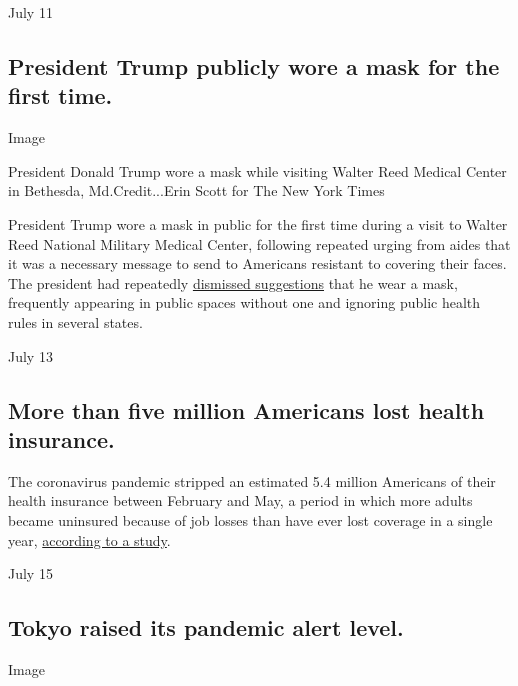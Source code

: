 July 11

\hypertarget{president-trump-publicly-wore-a-mask-for-the-first-time}{%
\subsection{President Trump publicly wore a mask for the first
time.}\label{president-trump-publicly-wore-a-mask-for-the-first-time}}

Image

President Donald Trump wore a mask while visiting Walter Reed Medical
Center in Bethesda, Md.Credit...Erin Scott for The New York Times

President Trump wore a mask in public for the first time during a visit
to Walter Reed National Military Medical Center, following repeated
urging from aides that it was a necessary message to send to Americans
resistant to covering their faces. The president had repeatedly
\href{https://www.nytimes3xbfgragh.onion/video/us/politics/100000007070943/trump-mask-coronavirus.html}{dismissed
suggestions} that he wear a mask, frequently appearing in public spaces
without one and ignoring public health rules in several states.

July 13

\hypertarget{more-than-five-million-americans-lost-health-insurance}{%
\subsection{More than five million Americans lost health
insurance.}\label{more-than-five-million-americans-lost-health-insurance}}

The coronavirus pandemic stripped an estimated 5.4 million Americans of
their health insurance between February and May, a period in which more
adults became uninsured because of job losses than have ever lost
coverage in a single year,
\href{https://www.nytimes3xbfgragh.onion/2020/07/13/us/politics/coronavirus-health-insurance-trump.html?action=click\&module=RelatedLinks\&pgtype=Article}{according
to a study}.

July 15

\hypertarget{tokyo-raised-its-pandemic-alert-level}{%
\subsection{Tokyo raised its pandemic alert
level.}\label{tokyo-raised-its-pandemic-alert-level}}

Image

